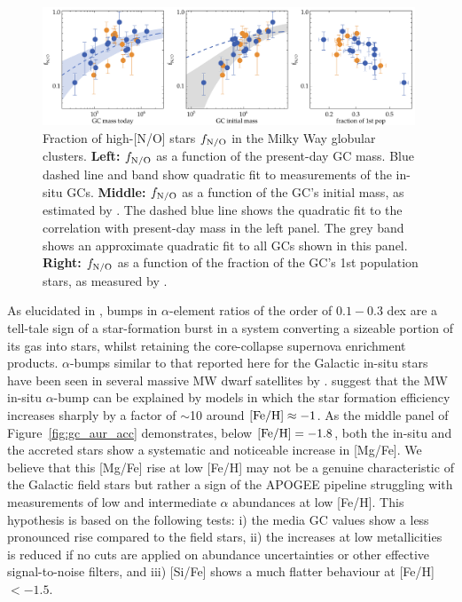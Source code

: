 \documentclass[a4paper,useAMS,usenatbib]{mnras}
\begin{document}
%
\begin{figure}
  \centering
  \includegraphics[width=0.99\textwidth]{img/gc_mass_ratio.pdf}
  \caption[]{Fraction of high-[N/O] stars $f_{\rm N/O}$ in the Milky Way globular clusters. {\bf Left:} $f_{\rm N/O}$ as a function of the present-day GC mass. Blue dashed line and band show quadratic fit to measurements of the in-situ GCs. {\bf Middle:} $f_{\rm N/O}$ as a function of the GC's initial mass, as estimated by \citet{Baumgardt2003}. The dashed blue line shows the quadratic fit to the correlation with present-day mass in the left panel. The grey band shows an approximate quadratic fit to all GCs shown in this panel. {\bf Right:} $f_{\rm N/O}$ as a function of the fraction of the GC's 1st population stars, as measured by \citet{Milone2017}. }
   \label{fig:gc_mass}
\end{figure}
%

As elucidated in \citet{Weinberg2017}, bumps in $\alpha$-element ratios of the order of $0.1-0.3$ dex are a tell-tale sign of a star-formation burst in a system converting a sizeable portion of its gas into stars, whilst retaining the core-collapse supernova enrichment products. $\alpha$-bumps similar to that reported here for the Galactic in-situ stars have been seen in several massive MW dwarf satellites by \citet{Hasselquist2021}. \citet{Conroy2022} suggest that the MW in-situ $\alpha$-bump can be explained by models in which the star formation efficiency increases sharply by a factor of $\sim$10 around $\rm [Fe/H]\approx-1$. As the middle panel of Figure~\ref{fig:gc_aur_acc} demonstrates, below $\rm [Fe/H]=-1.8$, both the in-situ and the accreted stars show a systematic and noticeable increase in [Mg/Fe]. We believe that this [Mg/Fe] rise at low [Fe/H] may not be a genuine characteristic of the Galactic field stars but rather a sign of the APOGEE pipeline struggling with measurements of low and intermediate $\alpha$ abundances at low [Fe/H]. This hypothesis is based on the following tests: i) the media GC values show a less pronounced rise compared to the field stars, ii) the increases at low metallicities is reduced if no cuts are applied on abundance uncertainties or other effective signal-to-noise filters, and iii) [Si/Fe] shows a much flatter behaviour at [Fe/H]$<-1.5$.
\end{document}
